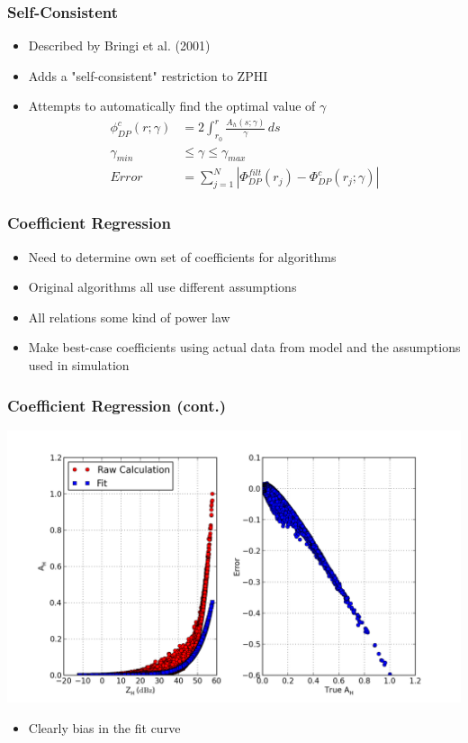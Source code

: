 \documentclass[red]{beamer}
\begin{document}
\begin{frame}
	\frametitle{Self-Consistent}
	\begin{itemize}
		\item Described by Bringi et al. (2001)
		\item Adds a "self-consistent" restriction to ZPHI
		\item Attempts to automatically find the optimal value of $\gamma$
			 \begin{align*}
			\phi_{DP}^c(r;\gamma) &= 2 \int_{r_0}^r \frac{A_h(s;\gamma)}{\gamma}\,ds \\
			\gamma_{min} &\leq \gamma \leq \gamma_{max} \\
			Error &= \sum_{j=1}^N \left| \Phi_{DP}^{filt}(r_j) - \Phi_{DP}^c(r_j;\gamma) \right|
			\end{align*}
	\end{itemize}
\end{frame}

\begin{frame}[<+->]
	\frametitle{Coefficient Regression}
	\begin{itemize}
		\item Need to determine own set of coefficients for algorithms
		\item Original algorithms all use different assumptions
		\item All relations some kind of power law
		\item Make best-case coefficients using actual data from model and
		the assumptions used in simulation
	\end{itemize}
\end{frame}

\begin{frame}
	\frametitle{Coefficient Regression (cont.)}
	\begin{center}
		\includegraphics[scale=0.35]{figures/basic_power_law.png}
	\end{center}
	\begin{itemize}
		\item Clearly bias in the fit curve
	\end{itemize}
\end{frame}
\end{document}
